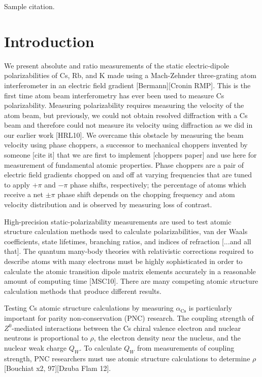 \documentclass[twocolumn, prl,showpacs,superscriptaddress]{revtex4-1}   %
\newcommand{\acs}{\alpha_{\textrm{Cs}}}
\begin{document}
Sample citation\cite{Hro14}.







\section{Introduction}

We present absolute and ratio measurements of the static electric-dipole polarizabilities of Cs, Rb, and K made using a Mach-Zehnder three-grating atom interferometer in an electric field gradient [Bermann][Cronin RMP]. This is the first time atom beam interferometry has ever been used to measure Cs polarizability. Measuring polarizability requires measuring the velocity of the atom beam, but previously, we could not obtain resolved diffraction with a Cs beam and therefore could not measure its velocity using diffraction as we did in our earlier work [HRL10]. We overcame this obstacle by measuring the beam velocity using phase choppers, a successor to mechanical choppers invented by someone [cite it] that we are first to implement [choppers paper] and use here for measurement of fundamental atomic properties. Phase choppers are a pair of electric field gradients chopped on and off at varying frequencies that are tuned to apply $+\pi$ and $-\pi$ phase shifts, respectively; the percentage of atoms which receive a net $\pm\pi$ phase shift depends on the chopping frequency and atom velocity distribution and is observed by measuring loss of contrast. 

High-precision static-polarizability measurements are used to test atomic structure calculation methods used to calculate polarizabilities, van der Waals coefficients, state lifetimes, branching ratios, and indices of refraction [...and all that]. The quantum many-body theories with relativistic corrections required to describe atoms with many electrons must be highly sophisticated in order to calculate the atomic transition dipole matrix elements accurately in a reasonable amount of computing time [MSC10]. There are many competing atomic structure calculation methods that produce different results.

Testing Cs atomic structure calculations by measuring $\acs$ is particularly important for parity non-conservation (PNC) research. The coupling strength of $Z^0$-mediated interactions between the Cs chiral valence electron and nuclear neutrons is proportional to $\rho$, the electron density near the nucleus, and the nuclear weak charge $Q_W$. To calculate $Q_W$ from measurements of coupling strength, PNC researchers must use atomic structure calculations to determine $\rho$ [Bouchiat x2, 97][Dzuba Flam 12]. 
\end{document}
